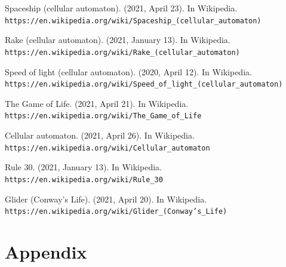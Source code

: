 \documentclass[12pt]{article}
\numberwithin{figure}{section} %
\begin{document}
\begin{thebibliography}{9}
Spaceship (cellular automaton). (2021, April 23). In Wikipedia.
\\\texttt{https://en.wikipedia.org/wiki/Spaceship\_(cellular\_automaton)}

Rake (cellular automaton). (2021, January 13). In Wikipedia.
\\\texttt{https://en.wikipedia.org/wiki/Rake\_(cellular\_automaton)}

Speed of light (cellular automaton). (2020, April 12). In Wikipedia.
\\\texttt{https://en.wikipedia.org/wiki/Speed\_of\_light\_(cellular\_automaton)}

The Game of Life. (2021, April 21). In Wikipedia. 
\\\texttt{https://en.wikipedia.org/wiki/The\_Game\_of\_Life}

Cellular automaton. (2021, April 26). In Wikipedia. 
\\\texttt{https://en.wikipedia.org/wiki/Cellular\_automaton}

Rule 30. (2021, January 13). In Wikipedia. 
\\\texttt{https://en.wikipedia.org/wiki/Rule\_30}

Glider (Conway’s Life). (2021, April 20). In Wikipedia. 
\\\texttt{https://en.wikipedia.org/wiki/Glider\_(Conway’s\_Life)}

\end{thebibliography}


\newpage
\section{Appendix}
\end{document}
